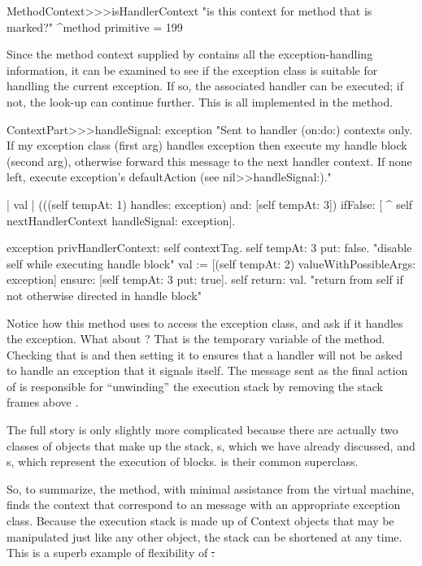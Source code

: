 \documentclass[a4paper,10pt,twoside]{book}
\begin{document}
\begin{code}{}
MethodContext>>>isHandlerContext 
	"is this context for method that is marked?" 
	^method primitive = 199 
\end{code}

Since the method context supplied by  contains all the exception-handling information, it can be examined to see if the exception class is suitable for handling the current exception.
If so, the associated handler can be executed; if not, the look-up can continue further. 
This is all implemented in the  method.

\begin{code}{}
ContextPart>>>handleSignal: exception
	"Sent to handler (on:do:) contexts only.  If my exception class (first arg) handles exception then execute my handle block (second arg), otherwise forward this message to the next handler context.  If none left, execute exception's defaultAction (see nil>>handleSignal:)."

	| val |
	(((self tempAt: 1) handles: exception) and: [self tempAt: 3]) ifFalse: [
		^ self nextHandlerContext handleSignal: exception].

	exception privHandlerContext: self contextTag.
	self tempAt: 3 put: false.  "disable self while executing handle block"
	val := [(self tempAt: 2) valueWithPossibleArgs: {exception}]
		ensure: [self tempAt: 3 put: true].
	self return: val.  "return from self if not otherwise directed in handle block"
\end{code}

Notice how this method uses  to access the exception class, and ask if it handles the exception.   What about  ?  That is the temporary variable  of the  method.   Checking that  is  and then setting it to  ensures that a handler will not be asked to handle an exception that it signals itself. 
The  message sent as the final action of  is responsible for ``unwinding'' the execution stack by removing the stack frames above \self{}.

The full story is only slightly more complicated because there are actually two classes of objects that make up the stack, s, which we have already discussed, and s, which represent the execution of blocks.   is their common superclass.

So, to summarize, the  method, with minimal assistance from the virtual machine, finds the context that correspond to an  message with an appropriate exception class.   Because the execution stack is made up of Context objects that may be manipulated just like any other object, the stack can be shortened at any time.  This is a superb example of flexibility of \st.
\end{document}
